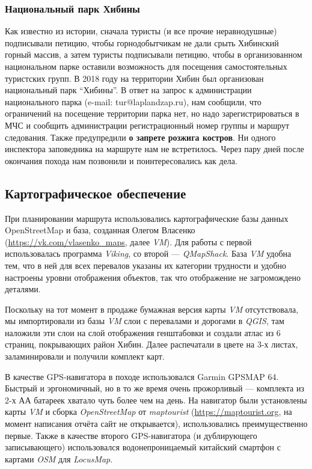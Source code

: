 \subsubsection{Национальный парк Хибины}
Как известно из истории, сначала туристы (и все прочие неравнодушные) подписывали петицию,
чтобы горнодобытчикам не дали срыть Хибинский горный массив, а затем туристы подписывали петицию,
чтобы в организованном национальном парке оставили возможность для посещения самостоятельных туристских групп.
В 2018 году на территории Хибин был организован национальный парк ``Хибины''.
В ответ на запрос к администрации национального парка (e-mail: tur@laplandzap.ru), нам сообщили,
что ограничений на посещение территории парка нет, но надо зарегистрироваться в МЧС
и сообщить администрации регистрационный номер группы и маршрут следования.
Также предупредили \textbf{\color{red}о запрете розжига костров}. Ни одного инспектора заповедника на маршруте нам не встретилось.
Через пару дней после окончания похода нам позвонили и поинтересовались как дела.

\subsection{Картографическое обеспечение}
При планировании маршрута использовались картографические базы данных OpenStreetMap и база,
созданная Олегом Власенко (\url{https://vk.com/vlasenko_maps}, далее \textit{VM}).
Для работы с первой использовалась программа \textit{Viking},
со второй --- \textit{QMapShack}. База \textit{VM} удобна тем, что в ней для всех перевалов указаны их категории трудности
и удобно настроены уровни отображения объектов, так что отображение не загромождено деталями.

Поскольку на тот момент в продаже бумажная версия карты \textit{VM} отсутствовала,
мы импортировали из базы \textit{VM} слои с перевалами и дорогами в \textit{QGIS},
там наложили эти слои на слой отображения генштабовки и создали атлас из 6 страниц,
покрывающих район Хибин. Далее распечатали в цвете на 3-х листах, заламинировали и получили комплект карт.

В качестве GPS-навигатора в походе использовался Garmin GPSMAP 64.
Быстрый и эргономичный, но в то же время очень прожорливый --- комплекта из 2-х АА батареек хватало чуть более чем на день.
На навигатор были установлены карты \textit{VM} и сборка \textit{OpenStreetMap}
от \textit{maptourist} (\url{https://maptourist.org}, на момент написания отчёта сайт не открывается),
использовались преимущественно первые. Также в качестве второго GPS-навигатора (и дублирующего записывающего)
использовался водонепроницаемый китайский смартфон с картами \textit{OSM} для \textit{LocusMap}.

